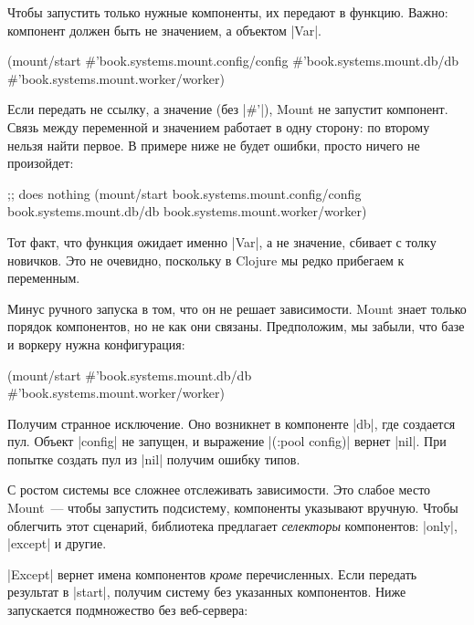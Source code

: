 Чтобы запустить только нужные компоненты, их передают в функцию. Важно:
компонент должен быть не значением, а объектом \spverb|Var|.

\begin{english}
  \begin{clojure}
(mount/start
  #'book.systems.mount.config/config
  #'book.systems.mount.db/db
  #'book.systems.mount.worker/worker)
  \end{clojure}
\end{english}

Если передать не ссылку, а значение (без \spverb|#'|), Mount не запустит
компонент. Связь между переменной и значением работает в одну сторону: по
второму нельзя найти первое. В примере ниже не будет ошибки, просто ничего не
произойдет:

\begin{english}
  \begin{clojure}
;; does nothing
(mount/start
  book.systems.mount.config/config
  book.systems.mount.db/db
  book.systems.mount.worker/worker)
  \end{clojure}
\end{english}

Тот факт, что функция ожидает именно \spverb|Var|, а не значение, сбивает с
толку новичков. Это не очевидно, поскольку в Clojure мы редко прибегаем к
переменным.

Минус ручного запуска в том, что он не решает зависимости. Mount знает только
порядок компонентов, но не как они связаны. Предположим, мы забыли, что базе и
воркеру нужна конфигурация:

\begin{english}
  \begin{clojure}
(mount/start
  #'book.systems.mount.db/db
  #'book.systems.mount.worker/worker)
  \end{clojure}
\end{english}

Получим странное исключение. Оно возникнет в компоненте \spverb|db|, где
создается пул. Объект \spverb|config| не запущен, и выражение
\spverb|(:pool config)| вернет \spverb|nil|. При попытке создать
пул из \spverb|nil| получим ошибку типов.

С ростом системы все сложнее отслеживать зависимости. Это слабое место Mount~---
чтобы запустить подсистему, компоненты указывают вручную. Чтобы облегчить этот
сценарий, библиотека предлагает \emph{селекторы} компонентов: \spverb|only|,
\spverb|except| и другие.

\spverb|Except| вернет имена компонентов \emph{кроме} перечисленных. Если
передать результат в \spverb|start|, получим систему без указанных
компонентов. Ниже запускается подмножество без веб-сервера:

